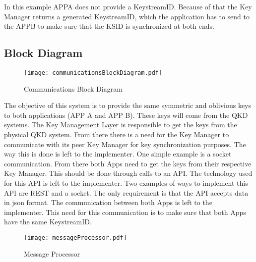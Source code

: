 \begin{refsection}
In this example APPA does not provide a Key\textunderscore stream\textunderscore ID. Because of that the Key Manager returns a generated Key\textunderscore stream\textunderscore ID, which the application has to send to the APPB to make sure that the KSID is synchronized at both ends.

\subsection{Block Diagram}



\begin{figure}[H]
	\centering
	\texttt{[image: communicationsBlockDiagram.pdf]}
	\caption{Communications Block Diagram}
	\label{fig:blockDiagram3}
\end{figure}

The objective of this system is to provide the same symmetric and oblivious keys to both applications (APP A and APP B). These keys will come from the QKD systems. The Key Management Layer is responsible to get the keys from the physical QKD system. From there there is a need for the Key Manager to communicate with its peer Key Manager for key synchronization purposes. The way this is done is left to the implementer. One simple example is a socket communication. From there both Apps need to get the keys from their respective Key Manager. This should be done through calls to an API. The technology used for this API is left to the implementer. Two examples of ways to implement this API are REST and a socket. The only requirement is that the API accepts data in json format. The communication between both Apps is left to the implementer. This need for this communication is to make sure that both Apps have the same Key\textunderscore stream\textunderscore ID.

\begin{figure}[H]
	\centering
	\texttt{[image: messageProcessor.pdf]}
	\caption{Message Processor}
	\label{fig:blockDiagram4}
\end{figure}


\end{refsection}

